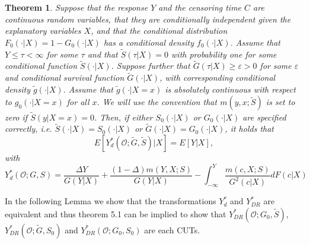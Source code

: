 \documentclass[12pt, a4paper]{scrartcl}
\theoremstyle{definition}
\theoremstyle{plain}
\newtheorem{Theorem}{Theorem}[section]
\numberwithin{equation}{section}
\numberwithin{figure}{section}
\numberwithin{table}{section}
\begin{document}
	\begin{Theorem}\label{thm:dr}
		Suppose that the response $Y$ and the censoring time $C$ are continuous random variables, that they are conditionally independent given the explanatory variables $X$, and that the conditional distribution $F_0(\cdot \vert X) = 1 - G_0(\cdot \vert X)$ has a conditional density $f_0(\cdot \vert X)$.
		Assume that $Y \leq \tau < \infty$ for some $\tau$ and that $\tilde{S}(\tau \vert X)=0$ with probability one for some conditional function $\tilde{S}(\cdot \vert X)$.
		Suppose further that $\tilde{G}(\tau \vert X)\geq \varepsilon > 0$ for some $\varepsilon$ and conditional survival function $\tilde{G}(\cdot \vert X)$, with corresponding conditional density $\tilde{g}(\cdot\vert X)$.
		Assume that $\tilde{g}(\cdot\vert X=x)$ is absolutely continuous with respect to $g_0(\cdot\vert X=x)$ for all $x$.
		We will use the convention that $m(y,x;\tilde{S})$ is set to zero if $\tilde{S}(y \vert X=x)=0$.
		Then, if either $S_0(\cdot\vert X)$ or $G_0(\cdot\vert X)$ are specified correctly, i.e. $\tilde{S}(\cdot\vert X)=S_0(\cdot\vert X)$ or $\tilde{G}(\cdot\vert X)=G_0(\cdot\vert X)$, it holds that
		\begin{equation*}
		E[Y_{d}^*(\mathcal{O};\tilde{G}, \tilde{S})\vert X] = E[Y \vert X],
		\end{equation*}
		with 
		\begin{equation}\label{eq:drcut2}
		Y_d^*(\mathcal{O}; G,S) = \frac{\Delta Y}{G(Y\vert X)}+\frac{(1-\Delta)m(Y,X;S)}{G(Y \vert X)}-\int_{-\infty}^{Y}\frac{m(c,X;S)}{G^2(c\vert X)}dF(c\vert X)
		\end{equation}
	\end{Theorem}
	In the following Lemma we show that the transformations $Y_d^*$ and $Y_{DR}^*$ are equivalent and thus theorem 5.1 can be implied to show that $Y_{DR}^*(\mathcal{O}; G_0, \tilde{S})$, $Y_{DR}^*(\mathcal{O}; \tilde{G}, S_0)$ and $Y_{DR}^*(\mathcal{O}; G_0, S_0)$ are each CUTs.
	
\end{document}
